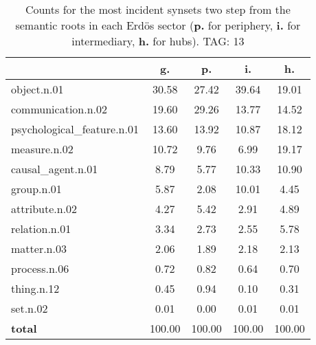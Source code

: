 \begin{table}[h!]
\begin{center}
\begin{tabular}{| l | c | c | c | c |}\hline
 & g. & p. & i. & h. \\\hline
object.n.01 & 30.58  & 27.42  & 39.64  & 19.01 \\\hline
communication.n.02 & 19.60  & 29.26  & 13.77  & 14.52 \\\hline
psychological\_feature.n.01 & 13.60  & 13.92  & 10.87  & 18.12 \\\hline
measure.n.02 & 10.72  & 9.76  & 6.99  & 19.17 \\\hline
causal\_agent.n.01 & 8.79  & 5.77  & 10.33  & 10.90 \\\hline
group.n.01 & 5.87  & 2.08  & 10.01  & 4.45 \\\hline
attribute.n.02 & 4.27  & 5.42  & 2.91  & 4.89 \\\hline
relation.n.01 & 3.34  & 2.73  & 2.55  & 5.78 \\\hline
matter.n.03 & 2.06  & 1.89  & 2.18  & 2.13 \\\hline
process.n.06 & 0.72  & 0.82  & 0.64  & 0.70 \\\hline
thing.n.12 & 0.45  & 0.94  & 0.10  & 0.31 \\\hline
set.n.02 & 0.01  & 0.00  & 0.01  & 0.01 \\\hline
{{\bf total}} & 100.00  & 100.00  & 100.00  & 100.00 \\\hline
\end{tabular}
\caption{Counts for the most incident synsets two step from the semantic roots in each Erd\"os sector ({\bf p.} for periphery, {\bf i.} for intermediary, {\bf h.} for hubs). TAG: 13}
\end{center}
\end{table}